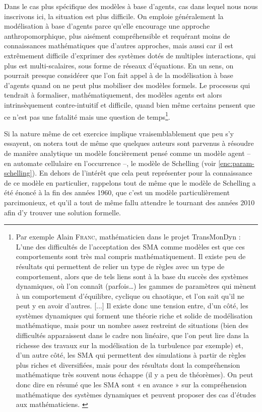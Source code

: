 Dans le cas plus spécifique des modèles à base d'agents, cas dans lequel nous nous inscrivons ici, la situation est plus difficile.
On emploie généralement la modélisation à base d'agents parce qu'elle encourage une approche anthropomorphique, plus aisément compréhensible et requérant moins de connaissances mathématiques que d'autres approches, mais aussi car il est extrêmement difficile d'exprimer des systèmes dotés de multiples interactions, qui plus est multi-scalaires, sous forme de réseaux d'équations.
En un sens, on pourrait presque considérer que l'on fait appel à de la modélisation à base d'agents quand on ne peut plus mobiliser des modèles formels.
Le processus qui tendrait à formaliser, mathématiquement, des modèles agents est alors intrinsèquement contre-intuitif et difficile, quand bien même certains pensent que ce n'est pas une fatalité mais une question de temps\footnote{
	Par exemple Alain \textsc{Franc}, mathématicien dans le projet TransMonDyn :
	\og L'une des difficultés de l'acceptation des SMA comme modèles est que ces comportements sont très mal compris mathématiquement.
	Il existe peu de résultats qui permettent de relier un type de règles avec un type de comportement, alors que de tels liens sont à la base du succès des systèmes dynamiques, où l'on connaît (parfois\ldots) les gammes de paramètres qui mènent à un comportement d'équilibre, cyclique ou chaotique, et l'on sait qu'il ne peut y en avoir d'autres.
	[...]
	Il existe donc une tension entre, d'un côté, les systèmes dynamiques qui forment une théorie riche et solide de modélisation mathématique, mais pour un nombre assez restreint de situations (bien des difficultés apparaissent dans le cadre non linéaire, que l'on peut lire dans la richesse des travaux sur la modélisation de la turbulence par exemple) et, d'un autre côté, les SMA qui permettent des simulations à partir de règles plus riches et diversifiées, mais pour des résultats dont la compréhension mathématique très souvent nous échappe (il y a peu de théorèmes).
	On peut donc dire en résumé que les SMA sont « en avance » sur la compréhension mathématique des systèmes dynamiques et peuvent proposer des cas d'études aux mathématiciens.\fg{}
	\autocite[Annexe 2, \og Retour sur les SMA comme outil et cadre conceptuel de modélisation.\fg{}, pp. 479-482 ]{ouriachi_lelaboration_2017}
}.

Si la nature même de cet exercice implique vraisemblablement que peu s'y essayent, on notera tout de même que quelques auteurs \autocite{zhang_tipping_2011,grauwin_dynamic_2012} sont parvenus à résoudre de manière analytique un modèle foncièrement pensé comme un modèle agent -- en automate cellulaire en l'occurrence --, le modèle de Schelling (voir \cref{enc:param-schelling}).
En dehors de l'intérêt que cela peut représenter pour la connaissance de ce modèle en particulier, rappelons tout de même que le modèle de Schelling a été énoncé à la fin des années 1960, que c'est un modèle particulièrement parcimonieux, et qu'il a tout de même fallu attendre le tournant des années 2010 afin d'y trouver une solution formelle.


